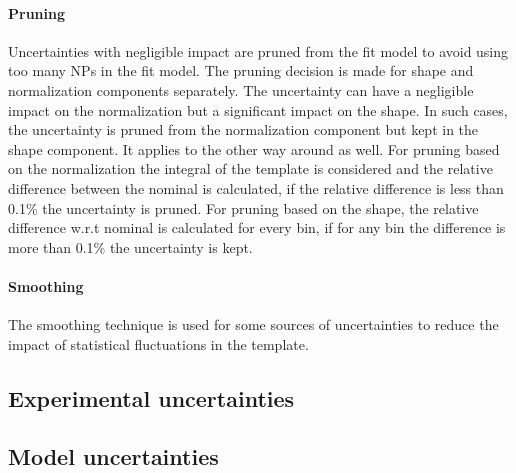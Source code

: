\paragraph{Pruning}Uncertainties with negligible impact are pruned from the fit model to avoid using too many NPs in the fit model. The pruning decision is made for shape and normalization components separately. The uncertainty can have a negligible impact on the normalization but a significant impact on the shape. In such cases, the uncertainty is pruned from the normalization component but kept in the shape component. It applies to the other way around as well. For pruning based on the normalization the integral of the template is considered and the relative difference between the nominal is calculated, if the relative difference is less than 0.1\% the uncertainty is pruned. For pruning based on the shape, the relative difference w.r.t nominal is calculated for every bin, if for any bin the difference is more than 0.1\% the uncertainty is kept.

\paragraph{Smoothing}The smoothing technique is used for some sources of uncertainties to reduce the impact of statistical fluctuations in the template.

\subsection{Experimental uncertainties}
\label{sec:experimental_uncertainties}


\subsection{Model uncertainties}
\label{sec:theoretical_uncertainties}


